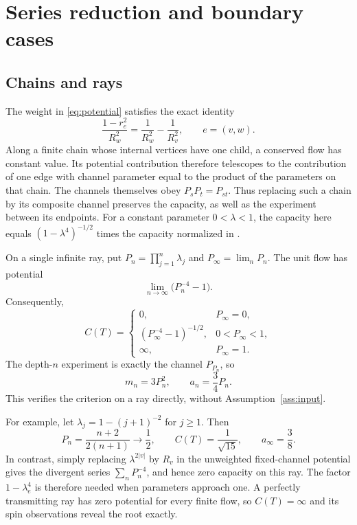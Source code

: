 \section{Series reduction and boundary cases}\label{sec:examples}

\subsection{Chains and rays}
The weight in \eqref{eq:potential} satisfies the exact identity
\begin{equation}\label{eq:series}
 \frac{1-r_e^2}{R_w^2}=\frac1{R_w^2}-\frac1{R_v^2},
 \qquad e=(v,w).
\end{equation}
Along a finite chain whose internal vertices have one child, a conserved
flow has constant value. Its potential contribution therefore telescopes
to the contribution of one edge with channel parameter equal to the
product of the parameters on that chain. The channels themselves obey
$P_sP_t=P_{st}$. Thus replacing such a chain by its composite channel
preserves the capacity, as well as the experiment between its endpoints.
For a constant parameter $0<\lambda<1$, the capacity here equals
$(1-\lambda^4)^{-1/2}$ times the capacity normalized in \cite{Capacity}.

On a single infinite ray, put $P_n=\prod_{j=1}^n\lambda_j$ and
$P_\infty=\lim_nP_n$. The unit flow has potential
\[
 \lim_{n\to\infty}\bigl(P_n^{-4}-1\bigr).
\]
Consequently,
\begin{equation}\label{eq:ray-capacity}
 C(T)=
 \begin{cases}
  0,&P_\infty=0,\\
  (P_\infty^{-4}-1)^{-1/2},&0<P_\infty<1,\\
  \infty,&P_\infty=1.
 \end{cases}
\end{equation}
The depth-$n$ experiment is exactly the channel $P_{P_n}$, so
\[
 m_n=3P_n^2,\qquad a_n=\frac34P_n.
\]
This verifies the criterion on a ray directly, without
Assumption~\ref{ass:input}.

For example, let $\lambda_j=1-(j+1)^{-2}$ for $j\geq1$.
Then
\[
 P_n=\frac{n+2}{2(n+1)}\longrightarrow\frac12,
 \qquad C(T)=\frac1{\sqrt{15}},\qquad a_\infty=\frac38.
\]
In contrast, simply replacing $\lambda^{2|v|}$ by $R_v$ in
the unweighted fixed-channel potential gives the divergent series
$\sum_nP_n^{-4}$, and hence zero capacity on this ray. The factor
$1-\lambda_e^4$ is therefore needed when parameters approach one.
A perfectly transmitting ray has zero potential for every finite flow,
so $C(T)=\infty$ and its spin observations reveal the root exactly.

